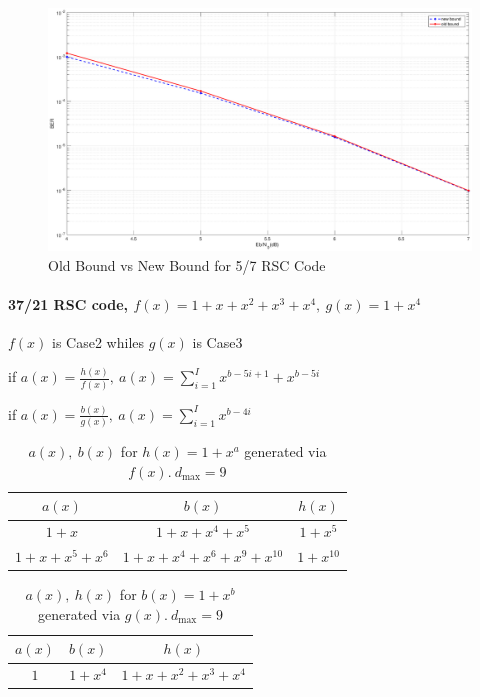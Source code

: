 \documentclass[11pt, oneside, dvipdfmx]{book}
\begin{document}
\begin{figure}[h]
\centering
		\includegraphics[width=\textwidth]{./Images/RSC_5_7.eps}
		\caption{Old Bound vs New Bound for 5/7 RSC Code}
		\label{fig1}
		\end{figure}


\newpage
\paragraph{37/21 RSC code, $f(x)=1+x+x^2+x^3+x^4,~g(x)=1+x^4$ \newline}
$f(x)$ is Case2 whiles $g(x)$ is Case3

if $a(x)=\frac{h(x)}{f(x)},~a(x)=\sum_{i=1}^{I}x^{b-5i+1}+x^{b-5i}$

if $a(x)=\frac{b(x)}{g(x)},~a(x)=\sum_{i=1}^{I}x^{b-4i}
$

\begin{table}[h!]
 \caption{$a(x),~b(x)$ for $h(x)=1+x^a$ generated via $f(x).~d_{\text{max}}=9$}
\centering
 \begin{tabular}{c c c} 
 \hline
 $a(x)$ & $b(x)$ & $h(x)$ \\ [0.5ex] 
 \hline\hline
$1+x$ & $1+x+x^{4}+x^5$ & $1+x^5$\\
\hline
$1+x+x^5+x^6$ & $1+x+x^4+x^6+x^{9}+x^{10}$ & $1+x^{10}$\\
 \end{tabular}
 \label{Tab3}
\end{table}

 \begin{table}[h!]
 \caption{$a(x),~h(x)$ for $b(x)=1+x^b$ generated via $g(x).~d_{\text{max}}=9$}
\centering
 \begin{tabular}{c c c} 
 \hline
 $a(x)$ & $b(x)$ & $h(x)$ \\ [0.5ex] 
 \hline\hline
$1$ & $1+x^{4}$ & $1+x+x^2+x^3+x^4$\\
 \end{tabular}
 \label{Tab4}
\end{table}
\end{document}
